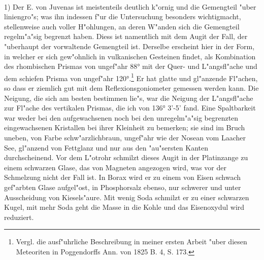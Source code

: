 \documentclass[a4paper, 11pt, oneside]{article}
\begin{document}
\paragraph{}
1) Der E. von Juvenas ist meistenteils deutlich k"ornig und die Gemengteil "uber liniengro"s; was ihn indessen f"ur die Untersuchung besonders wichtigmacht, stellenweise auch voller H"ohlungen‚ an deren W"anden sich die Gemengteil regelm"a"sig begrenzt haben. Diess ist namentlich mit dem Augit der Fall, der "uberhaupt der vorwaltende Gemengteil ist. Derselbe erscheint hier in der Form, in welcher er sich gew"ohnlich in vulkanischen Gesteinen findet, als Kombination des rhombischen Prismas von ungef"ahr 88° mit der Quer- und L"angsfl"ache und dem schiefen Prisma von ungef"ahr 120°.\footnote{Vergl. die ausf"uhrliche Beschreibung in meiner ersten Arbeit "uber diesen Meteoriten in Poggendorffs Ann. von 1825 B. 4, S. 173.} Er hat glatte und gl"anzende Fl"achen, so dass er ziemlich gut mit dem Reflexionsgoniometer gemessen werden kann. Die Neigung, die sich am besten bestimmen lie"s, war die Neigung der L"angsfl"ache zur Fl"ache des vertikalen Prismas, die ich von 136° 3’-5’ fand. Eine Spaltbarkeit war weder bei den aufgewachsenen noch bei den unregelm"a"sig begrenzten eingewachsenen Kristallen bei ihrer Kleinheit zu bemerken; sie sind im Bruch uneben, von Farbe schw"arzlichbraun, ungef"ahr wie der Nosean vom Laacher See, gl"anzend von Fettglanz und nur aus den "au"sersten Kanten durchscheinend. Vor dem L"otrohr schmilzt dieses Augit in der Platinzange zu einem schwarzen Glase, das von Magneten angezogen wird, was vor der Schmelzung nicht der Fall ist. In Borax wird er zu einem von Eisen schwach gef"arbten Glase aufgel"ost, in Phosphorsalz ebenso, nur schwerer und unter Ausscheidung von Kiesels"aure. Mit wenig Soda schmilzt er zu einer schwarzen Kugel, mit mehr Soda geht die Masse in die Kohle und das Eisenoxydul wird reduziert.
\end{document}
